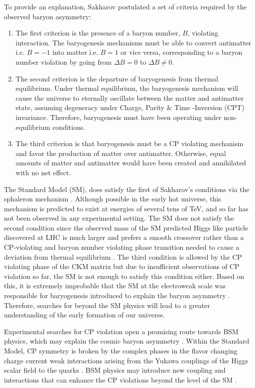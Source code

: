 To provide an explanation, Sakharov postulated a set of criteria \cite{Sakharov1991} required by the observed baryon asymmetry:
\begin{enumerate}
    \item The first criterion is the presence of a baryon number, $B$, violating interaction. The baryogenesis mechanisms must be able to convert antimatter i.e. $ B  = -1$  into matter i.e. $ B  = 1$ or vice versa, corresponding to a baryon number violation by going from $ \Delta  B  = 0$ to $ \Delta  B  \neq 0$.
    \item The second criterion is the departure of baryogenesis from thermal equilibrium. Under thermal equilibrium, the baryogenesis mechanism will cause the universe to eternally oscillate between the matter and antimatter state, assuming degeneracy under Charge, Parity \& Time -Inversion (CPT) invariance. Therefore, baryogenesis must have been operating under non-equilibrium conditions.
    \item The third criterion is that baryogenesis must be a CP violating mechanism and favor the production of matter over antimatter. Otherwise, equal amounts of matter and antimatter would have been created and annihilated with no net effect.
\end{enumerate}

The Standard Model (SM), does satisfy the first of Sakharov’s conditions via the sphaleron mechanism \cite{Kuzmin1985, Hooft1976}. Although possible in the early hot universe, this mechanism is predicted to exist at energies of several tens of TeV, and so far has not been observed in any experimental setting. The SM does not satisfy the second condition since the observed mass of the SM predicted Higgs like particle discovered at LHC is much larger \cite{Sirunyan2020} and prefers a smooth crossover rather than a CP-violating and baryon number violating phase transition needed to cause a deviation from thermal equilibrium \cite{Morrissey2012}. The third condition is allowed by the CP violating phase of the CKM matrix \cite{Kobayashi1973} but due to insufficient observations of CP violation so far, the SM is not enough to satisfy this condition either. Based on this, it is extremely improbable that the SM at the electroweak scale was responsible for baryogenesis introduced to explain the baryon asymmetry \cite{Canetti2012, Morrissey2012, Dine2003}. Therefore, searches for beyond the SM physics will lead to a greater understanding of the early formation of our universe.

Experimental searches for CP violation open a promising route towards BSM physics, which may explain the cosmic baryon asymmetry \cite{Morrissey2012, Bigi2009, Sozzi2008}. Within the Standard Model, CP symmetry is broken by the complex phases in the flavor changing charge current weak interactions arising from the Yukawa couplings of the Higgs scalar field to the quarks \cite{Kobayashi1973}. BSM physics may introduce new coupling and interactions that can enhance the CP violations beyond the level of the SM \cite{Bigi2009, Sozzi2008}.

